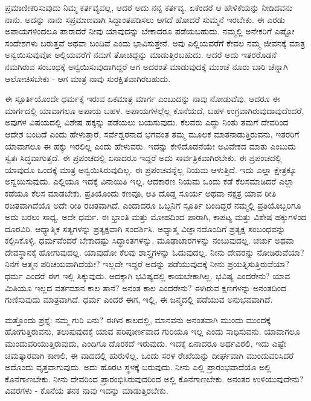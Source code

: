 ಪ್ರಮಾಣೀಕರಿಸುವುದು ನಿಮ್ಮ ಕರ್ತವ್ಯವಲ್ಲ, ಆದರೆ ಅದು ನನ್ನ ಕರ್ತವ್ಯ. ಏಕೆಂದರೆ ಆ ಹೇಳಿಕೆಯನ್ನು ನೀಡಿದವನು ನಾನು. ಅದನ್ನು ನಾನು ಸಪ್ರಮಾಣವಾಗಿ ಸಿದ್ದಾಂತಪಡಿಸಲು ಆಗದೆ ಹೋದರೆ ಸುಮ್ಮನೆ ಇರಬೇಕು. ಈ ಎರಡು ಅಪಾಯಗಳಿಂದಲೂ ಪಾರಾದರೆ ನೀವು ಯಾವುದನ್ನು ಬೇಕಾದರೂ ಪಡೆಯಬಹುದು. ನಮ್ಮಲ್ಲಿ ಅನೇಕರಿಗೆ ಎಷ್ಟೋ ಸಂದೇಶಗಳು ಬರುತ್ತವೆ ಅಥವಾ ಬಂದಿವೆ ಎಂದು ಭಾವಿಸುತ್ತೇನೆ. ಅವು ಎಲ್ಲಿಯವರೆಗೆ ಕೇವಲ ನಮ್ಮ ಜೀವನಕ್ಕೆ ಮಾತ್ರ ಅನ್ವಯಿಸುವುವೋ ಅಲ್ಲಿಯವರೆಗೆ ನಮಗೆ ತೋಚಿದ್ದನ್ನು ಮಾಡುತ್ತಿರಬಹುದು. ಆದರೆ ಅದು ಇತರರೊಡನೆ ನಮಗಿರುವ ಸಂಬಂಧಕ್ಕೆ ಅನ್ವಯಿಸುವುದಾಗಿದ್ದರೆ ಆಗ ಅದರಂತೆ ಮಾಡುವುದಕ್ಕೆ ಮುಂಚೆ ನೂರು ಬಾರಿ ಚೆನ್ನಾಗಿ ಆಲೋಚಿಸಬೇಕು - ಆಗ ಮಾತ್ರ ನಾವು ಸುರಕ್ಷಿತವಾಗಿರಬಹುದು.

ಈ ಸ್ಪೂರ್ತಿಯೊಂದೇ ಧರ್ಮಕ್ಕೆ ಇರುವ ಏಕಮಾತ್ರ ಮಾರ್ಗ ಎಂಬುದನ್ನು ನಾವು ನೋಡುವೆವು. ಆದರೂ ಈ ಮಾರ್ಗದಲ್ಲಿ ಯಾವಾಗಲೂ ಅಪಾಯ ಬಹಳ. ಅಪಾಯಗಳಲ್ಲೆಲ್ಲ ಕೊನೆಯದೆ, ಬಹಳ ಉಗ್ರವಾಗಿರುವುದಾವುದೆಂದರೆ, ಅವುಗಳ ವಿಷಯದಲ್ಲಿ ವಿಶೇಷ ಹಕ್ಕನ್ನು ಪಡೆಯಲು ಬಯಸುವುದು. ಕೆಲವರು ಎದ್ದು ನಿಂತು ತಮಗೆ ದೇವರಿಂದ ಆದೇಶ ಬಂದಿದೆ ಎಂದು ಹೇಳುತ್ತಾರೆ, ಸರ್ವೆಶ್ವರನಾದ ಭಗವಂತ ತಮ್ಮ ಮೂಲಕ ಮಾತನಾಡುತ್ತಿರುವನು, ಇತರರಿಗೆ ಯಾವಾಗಲೂ ಈ ಹಕ್ಕು ಇರಲಿಲ್ಲ ಎಂದು ಹೇಳುವರು. ಇದನ್ನು ಕೇಳಿದೊಡನೆಯೇ ಅವಿವೇಕದ ಮಾತು ಎಂಬುದು ಸ್ವತಃ ಸಿದ್ಧವಾಗುತ್ತದೆ. ಈ ಪ್ರಪಂಚದಲ್ಲಿ ಏನಾದರೂ ಇದ್ದರೆ ಅದು ಸಾರ್ವತ್ರಿಕವಾಗಿರಬೇಕು. ಈ ಪ್ರಪಂಚದಲ್ಲಿ ಯಾವುದೂ ಒಂದಕ್ಕೆ ಮಾತ್ರ ಅನ್ವಯಿಸಿರುವುದಿಲ್ಲ. ಈ ಪ್ರಪಂಚವನ್ನೆಲ್ಲ ನಿಯಮ ಆಳುತ್ತಿದೆ. ಇದು ಎಲ್ಲಾ ಕ್ಷೇತ್ರಕ್ಕೂ ಅನ್ವಯಿಸುವುದು. ಎಲ್ಲಿಯೂ ಇದಕ್ಕೆ ವಿನಾಯಿತಿ ಇಲ್ಲ. ಆದಕಾರಣ ನಿಯಮ ಒಂದು ಕಡೆ ಕೆಲಸಮಾಡಿದರೆ ಎಲ್ಲಾ ಕಡೆಯೂ ಕೆಲಸ ಮಾಡಬೇಕು. ಪ್ರತಿಯೊಂದು ಕಣವೂ, ಅತಿ ದೊಡ್ಡ ಸೂರ್ಯ ಅಥವಾ ನಕ್ಷತ್ರ ಯಾವ ರೀತಿ ರಚಿತವಾಗಿದೆಯೊ ಅದೇ ರೀತಿ ರಚಿತವಾಗಿದೆ. ಎಂದಾದರೂ ಒಬ್ಬನಿಗೆ ಸ್ಪೂರ್ತಿ ಬಂದಿದ್ದರೆ ನಮ್ಮಲ್ಲಿ ಪ್ರತಿಯೊಬ್ಬರಿಗೂ ಅದು ಬರಲು ಸಾಧ್ಯ. ಅದೇ ಧರ್ಮ. ಈ ಭ್ರಾಂತಿ ಮತ್ತು ಮೋಹದಿಂದ ಪಾರಾಗಿ, ಕಾಪಟ್ಯ ಮತ್ತು ವಿಶೇಷ ಹಕ್ಕುಗಳಿಂದ ದೂರವಿರಿ. ಆಧ್ಯಾತ್ಮಿಕ ಸತ್ಯಗಳನ್ನು ಪ್ರತ್ಯಕ್ಷವಾಗಿ ಸಂದರ್ಶಿಸಿ. ಅಧ್ಯಾತ್ಮ ವಿಜ್ಞಾನದೊಂದಿಗೆ ಪ್ರತ್ಯಕ್ಷ ಸಂಬಂಧವನ್ನು ಕಲ್ಪಿಸಿಕೊಳ್ಳಿ. ಧರ್ಮವೆಂದರೆ ಬೇಕಾದಷ್ಟು ಸಿದ್ಧಾಂತಗಳನ್ನು, ಮೂಢಾಚಾರಗಳನ್ನು ನಂಬುವುದಲ್ಲ. ಚರ್ಚು ಅಥವಾ ದೇವಸ್ಥಾನಕ್ಕೆ ಹೋಗುವುದಲ್ಲ. ಯಾವುದೋ ಕೆಲವು ಶಾಸ್ತ್ರಗಳನ್ನು ಓದುವುದಲ್ಲ. ನೀನು ದೇವರನ್ನು ನೋಡಿರುವೆಯಾ? ನಿನಗೆ ಆತ್ಮನ ಪರಿಚಯವಾಗಿದೆಯೇ? ಇಲ್ಲದೇ ಇದ್ದರೆ ಅದನ್ನು ಪಡೆಯುವುದಕ್ಕೆ ನೀನು ಪ್ರಯತ್ನಿಸುತ್ತಿರುವೆಯಾ? ಧರ್ಮ ಎಂದರೆ ಈಗ ಇಲ್ಲಿ ಸಿಕ್ಕುವುದು. ಅದಕ್ಕಾಗಿ ಭವಿಷ್ಯದಲ್ಲಿ ಕಾಯಬೇಕಾಗಿಲ್ಲ. ಭವಿಷ್ಯ ಎಂದರೇನು? ಯಾವ ಮಿತಿಯೂ ಇಲ್ಲದ ವರ್ತಮಾನ ಕಾಲ ತಾನೆ? ಅನಂತ ಕಾಲ ಎಂದರೇನು? ಈಗಿರುವ ಕ್ಷಣಗಳನ್ನು ಅನಂತದಿಂದ ಗುಣಿಸುವುದು ಮಾತ್ರವಾಗಿದೆ. ಧರ್ಮ ಎಂದರೆ ಈಗ, ಇಲ್ಲಿ, ಈ ಜನ್ಮದಲ್ಲಿ ಪಡೆಯುವ ಅನುಭವವಾಗಿದೆ.

ಮತ್ತೊಂದು ಪ್ರಶ್ನೆ: ನಮ್ಮ ಗುರಿ ಏನು? ಈಗಿನ ಕಾಲದಲ್ಲಿ, ಮಾನವನು ಅನಂತವಾಗಿ ಮುಂದು ಮುಂದಕ್ಕೆ ಹೋಗುತ್ತಿರುವನು, ತಲುಪುವುದಕ್ಕೆ ಯಾವ ಪರಿಪೂರ್ಣವಾದ ಗುರಿಯೂ ಇಲ್ಲ ಎಂದು ಸಾಧಿಸುವನು. ಯಾವಾಗಲೂ ಮುಂದುವರಿಯುತ್ತಿರುವುದು, ಎಂದಿಗೂ ದೊರಕದೆ ಇರುವುದು. ಇದಕ್ಕೆ ಏನಾದರೂ ಅರ್ಥವಿರಲಿ, ಇದು ಎಷ್ಟೇ ಚಮತ್ಕಾರವಾಗಿ ಕಾಣಲಿ, ಈ ವಾದದಲ್ಲಿ ಹುರುಳಿಲ್ಲ. ಒಂದು ಸರಳ ರೇಖೆಯನ್ನು ದೀರ್ಘವಾಗಿ ಮುಂದುವರಿಸಿದರೆ ಅದೊಂದು ವೃತ್ತವಾಗುವುದು. ಅದು ಹೊರಟ ಸ್ಥಳಕ್ಕೆ ಬರುವುದು. ನೀನು ಎಲ್ಲಿ ಪ್ರಾರಂಭವಾದೆಯೊ ಅಲ್ಲಿ ಕೊನೆಗಾಣಬೇಕು. ನೀನು ದೇವರಿಂದ ಪ್ರಾರಂಭಿಸಿರುವುದರಿಂದ ಅಲ್ಲಿ ಕೊನೆಗಾಣಬೇಕು. ಅನಂತರ ಉಳಿಯುವುದೇನು? ವಿವರಗಳು - ಕೊನೆಯ ತನಕ ನಾವು ಇದನ್ನು ಮಾಡುತ್ತಿರಬೇಕು.

